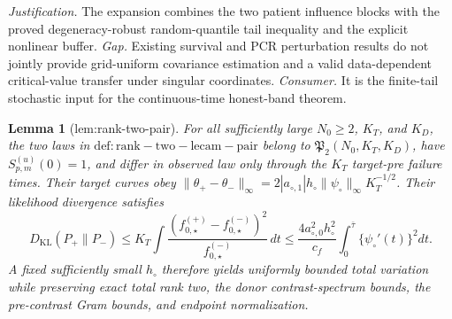 \documentclass{article}
\newtheorem{lemma}{Lemma}
\begin{document}
\par\smallskip\noindent \textit{Justification.} The expansion combines the two patient influence blocks with the proved degeneracy-robust random-quantile tail inequality and the explicit nonlinear buffer. \textit{Gap.} Existing survival and PCR perturbation results do not jointly provide grid-uniform covariance estimation and a valid data-dependent critical-value transfer under singular coordinates. \textit{Consumer.} It is the finite-tail stochastic input for the continuous-time honest-band theorem.

\begin{lemma}[lem:rank-two-pair]\label{lem:rank-two-pair}
For all sufficiently large \(N_0\ge2\), \(K_T\), and \(K_D\), the two laws in \(\mathrm{def:rank-two-lecam-pair}\) belong to \(\mathfrak P_2(N_0,K_T,K_D)\), have \(S_{p,m}^{(u)}(0)=1\), and differ in observed law only through the \(K_T\) target-pre failure times. Their target curves obey \(\|\theta_+-\theta_-\|_\infty=2|a_{\circ,1}|h_\circ\|\psi_\circ\|_\infty K_T^{-1/2}\). Their likelihood divergence satisfies \[D_{\mathrm{KL}}(P_+\|P_-)\le K_T\int\frac{(f_{0,\star}^{(+)}-f_{0,\star}^{(-)})^2}{f_{0,\star}^{(-)}}\,dt\le\frac{4a_{\circ,0}^2h_\circ^2}{c_f}\int_0^{\bar\tau}\{\psi_\circ'(t)\}^2dt.\] A fixed sufficiently small \(h_\circ\) therefore yields uniformly bounded total variation while preserving exact total rank two, the donor contrast-spectrum bounds, the pre-contrast Gram bounds, and endpoint normalization.
\end{lemma}
\end{document}
